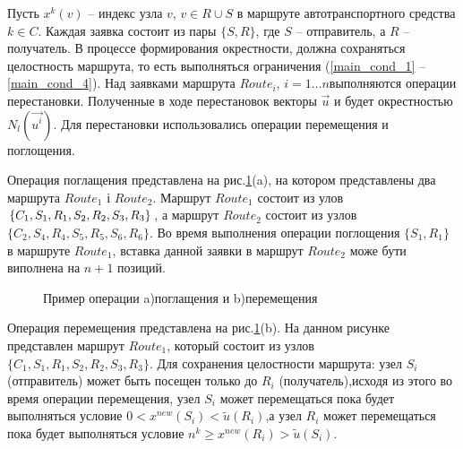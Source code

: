\documentclass[]{TAACpaper}
\begin{document}
Пусть $x^{k}(v)$ -- индекс узла $v$, $v \in R \cup S$ в маршруте автотранспортного средства $k \in C$. Каждая заявка состоит из пары $\{S,R\}$, где $S$ -- отправитель, а $R$ -- получатель. В процессе формирования окрестности, должна сохраняться целостность маршрута, то есть выполняться ограничения (\ref{main_cond_1} --\ref{main_cond_4}). Над заявками маршрута $Route_i$, $i=1 \dots n$выполняются операции перестановки. Полученные в ходе перестановок векторы $\vec{u}$ и будет окрестностью $N_{l}(\vec{u^i})$. Для перестановки использовались операции перемещения и поглощения.

Операция поглащения представлена на рис.\ref{ris:figures}(a), на котором представлены два маршрута $Route_1$ і $Route_2$. Маршрут $Route_1$ состоит из улов $\{C_1,S_1,R_1,S_2,\\R_2,S_3,R_3\}$, а маршрут $Route_2$ состоит из узлов $\{C_2,S_4,R_4,S_5,R_5,S_6,R_6\}$. Во время выполнения операции поглощения $\{S_1,R_1\}$ в маршруте $Route_1$, вставка данной заявки в маршрут $Route_2$ може бути виполнена на $n+1$ позиций. 

\begin{figure}[h]
	\caption{Пример операции a)поглащения и b)перемещения}
	\label{ris:figures}
\end{figure}

Операция перемещения представлена на рис.\ref{ris:figures}(b). На данном рисунке представлен маршрут $Route_1$, который состоит из узлов $\{C_1,S_1,R_1,S_2,R_2,S_3,R_3\}$. Для сохранения целостности маршрута: узел $S_i$ (отправитель) может быть посещен только до $R_i$ (получатель),исходя из этого во время операции перемещения, узел $S_i$ может перемещаться пока будет выполняться условие $0<x^{new}(S_i)<\widetilde{u}(R_i)$,а узел $R_i$ может перемещаться пока будет выполняться условие $n^k \geq x^{new}(R_i)>\widetilde{u}(S_i)$.
\end{document}
